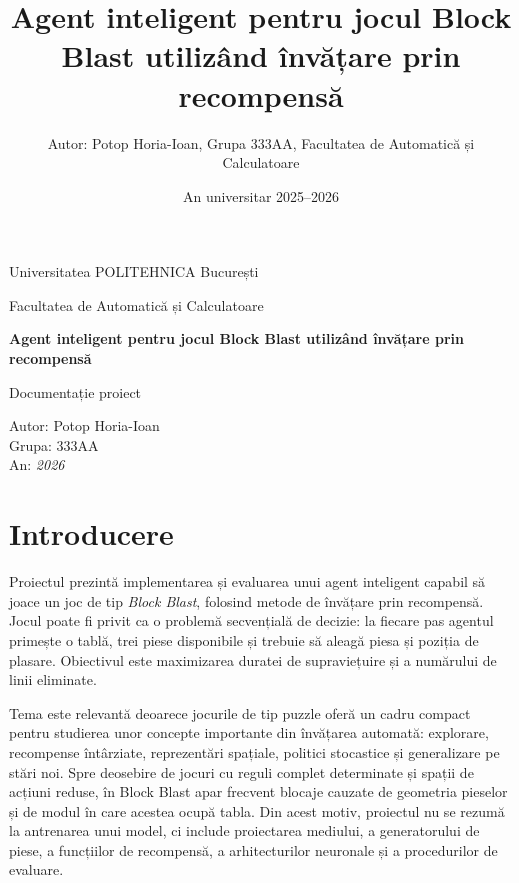 \documentclass[12pt,a4paper]{article}
\title{\textbf{Agent inteligent pentru jocul Block Blast utilizând învățare prin recompensă}}
\author{Autor: Potop Horia-Ioan, Grupa 333AA, Facultatea de Automatică și Calculatoare}
\date{An universitar 2025--2026}
\begin{document}
\begin{titlepage}
    \centering
    \vspace*{2cm}
    {\Large Universitatea POLITEHNICA București \par}
    \vspace{1cm}
    {\large Facultatea de Automatică și Calculatoare \par}
    \vspace{2.5cm}
    {\Huge \textbf{Agent inteligent pentru jocul Block Blast utilizând învățare prin recompensă} \par}
    \vspace{1.5cm}
    {\Large Documentație proiect \par}
    \vfill
    \begin{flushright}
        \large
        Autor: Potop Horia-Ioan \\
        Grupa: 333AA \\
        An: \textit{2026}
    \end{flushright}
    \vspace{1cm}
\end{titlepage}

\tableofcontents
\newpage

\section{Introducere}

Proiectul prezintă implementarea și evaluarea unui agent inteligent capabil să joace un joc de tip \textit{Block Blast}, folosind metode de învățare prin recompensă. Jocul poate fi privit ca o problemă secvențială de decizie: la fiecare pas agentul primește o tablă, trei piese disponibile și trebuie să aleagă piesa și poziția de plasare. Obiectivul este maximizarea duratei de supraviețuire și a numărului de linii eliminate.

Tema este relevantă deoarece jocurile de tip puzzle oferă un cadru compact pentru studierea unor concepte importante din învățarea automată: explorare, recompense întârziate, reprezentări spațiale, politici stocastice și generalizare pe stări noi. Spre deosebire de jocuri cu reguli complet determinate și spații de acțiuni reduse, în Block Blast apar frecvent blocaje cauzate de geometria pieselor și de modul în care acestea ocupă tabla. Din acest motiv, proiectul nu se rezumă la antrenarea unui model, ci include proiectarea mediului, a generatorului de piese, a funcțiilor de recompensă, a arhitecturilor neuronale și a procedurilor de evaluare.
\end{document}
